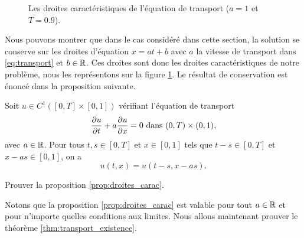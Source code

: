 \documentclass[12pt,a4paper,twoside]{article}
\begin{document}
\begin{figure}
\centering
\begin{tikzpicture}[scale = 9]
  
\end{tikzpicture}
\caption{Les droites caract\'eristiques de l'\'equation de transport
  ($a=1$ et $T=0.9$).}
\label{fig:D_carac}
\end{figure}

Nous pouvons montrer que dans le cas consid\'er\'e dans cette section,
la solution se conserve sur les droites d'\'equation $x=at+b$ avec 
$a$ la vitesse de transport dans \eqref{eq:transport} et $b \in \R$.
Ces droites sont donc les droites caract\'eristiques de notre probl\`eme,
nous les repr\'esentons sur la figure \ref{fig:D_carac}.
Le r\'esultat de conservation est \'enonc\'e dans la proposition suivante.

\begin{proposition}
  \label{prop:droites_carac}
  Soit $u \in C^1([0,T] \times [0,1])$ v\'erifiant l'\'equation de transport
  \begin{align*}
    \dfrac{\partial u}{\partial t} + a \dfrac{\partial u}{\partial x} = 0 
    \dans (0,T) \times (0,1) ,
  \end{align*}
  avec $a \in \R$.
  Pour tous $t,s \in [0,T]$ et $x \in [0,1]$ tels que
  $t-s \in [0,T]$ et $x-as \in [0,1]$, on a
  \[
    u(t,x) = u(t-s , x-as) .
  \]
\end{proposition}

\begin{exercise}
  Prouver la proposition \ref{prop:droites_carac}.
\end{exercise}


Notons que la proposition \ref{prop:droites_carac} est valable pour tout $a \in \R$
et pour n'importe quelles conditions aux limites. Nous allons maintenant prouver
le th\'eor\`eme \ref{thm:transport_existence}.
\end{document}

